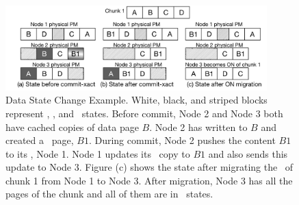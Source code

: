{
\begin{figure}[t]
\centering
\begin{center}
\centerline{\includegraphics[width=0.9\textwidth]{hotpot/Figures/data-eg.pdf}}
\end{center}
\caption[Data State Change Example.]
{Data State Change Example.
White, black, and striped blocks represent \committed, \redundant, and \dirty\ states.
Before commit, Node 2 and Node 3 both have cached copies of 
data page $B$. Node 2 has written to $B$ and created a \dirty\ page, $B1$.
During commit, Node 2 pushes the content $B1$ to its \on, Node 1.
Node 1 updates its \committed\ copy to $B1$ and also sends this update to Node 3.
Figure (c) shows the state after migrating the \on\ of chunk 1 from Node 1 to Node 3. 
After migration, Node 3 has all the pages of the chunk and all of them are in \committed\ states.
}
\label{fig-data-eg}
\end{figure}
}